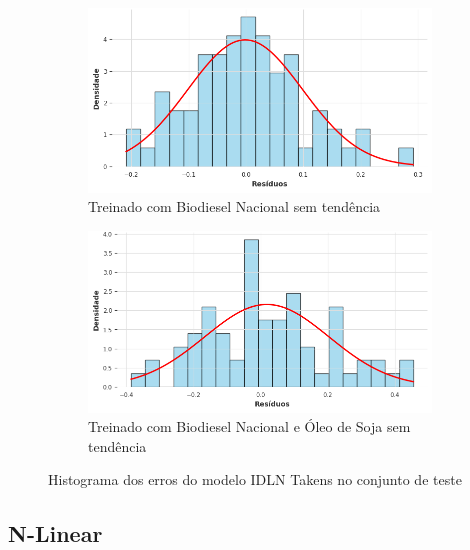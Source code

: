 \begin{figure}[htbp]
	\begin{subfigure}[b]{0.40\textwidth}
		\centering
		\includegraphics[width=\textwidth]{figuras/idln_takens_brasil_detrend_residuals_histogram.png} %
		\caption{Treinado com Biodiesel Nacional sem tendência}
		\label{fig:idln_takens_brasil_detrend_residuals_histogram}
	\end{subfigure}
	\hfill
	\begin{subfigure}[b]{0.40\textwidth}
		\centering
		\includegraphics[width=\textwidth]{figuras/idln_takens_brasil_oil_detrend_residuals_histogram.png} %
		\caption{Treinado com Biodiesel Nacional e Óleo de Soja sem tendência}
		\label{fig:idln_takens_brasil_oil_detrend_residuals_histogram}
	\end{subfigure}

	\caption{Histograma dos erros do modelo \acs{IDLN} Takens no conjunto de teste}
	\label{fig:idln_takens_residuals_histogram}
\end{figure}

\subsection{\acs{N-Linear}}
